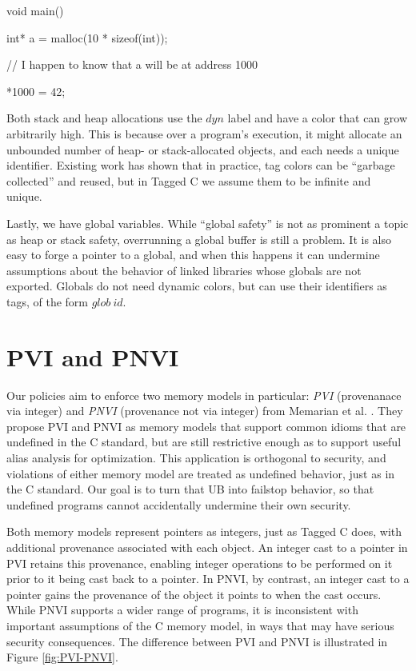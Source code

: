 \documentclass{article}
\begin{document}
\vspace{\abovedisplayskip}
{\tt

  void main() {

    int* a = malloc(10 * sizeof(int));

    // I happen to know that a will be at address 1000

    *1000 = 42;
    
  }

}
\vspace{\belowdisplayskip}

Both stack and heap allocations use the \(\mathit{dyn}\) label and have a color that can grow arbitrarily
high. This is because over a program's execution, it might allocate an unbounded number of heap- or
stack-allocated objects, and each needs a unique identifier. Existing work has shown that in practice,
tag colors can be ``garbage collected'' and reused, but in Tagged C we assume them to be infinite and unique.

Lastly, we have global variables. While ``global safety'' is not as prominent a topic as heap or
stack safety, overrunning a global buffer is still a problem. It is also easy to forge a pointer to a global,
and when this happens it can undermine assumptions about the behavior of linked libraries whose globals
are not exported. Globals do not need dynamic colors, but can use their identifiers as tags, of the form
\(\mathit{glob} ~ id\).

\section{PVI and PNVI}

Our policies aim to enforce two memory models in particular: {\it PVI} (provenanace via integer) and
{\it PNVI} (provenance not via integer) from Memarian et al. \cite{???}. They propose PVI and PNVI
as memory models that support common idioms that are undefined in the C standard, but are still restrictive
enough as to support useful alias analysis for optimization. This application is orthogonal to
security, and violations of either memory model are treated as undefined behavior, just as in the
C standard. Our goal is to turn that UB into failstop behavior, so that undefined programs cannot accidentally
undermine their own security.

Both memory models represent pointers as integers, just as Tagged C does, with additional provenance
associated with each object. An integer cast to a pointer in PVI retains this provenance, enabling
integer operations to be performed on it prior to it being cast back to a pointer.
In PNVI, by contrast, an integer cast to a pointer gains the provenance of the object it points
to when the cast occurs. While PNVI supports a wider range of programs, it is inconsistent with important
assumptions of the C memory model, in ways that may have serious security consequences.
The difference between PVI and PNVI is illustrated in Figure \ref{fig:PVI-PNVI}.
\end{document}
